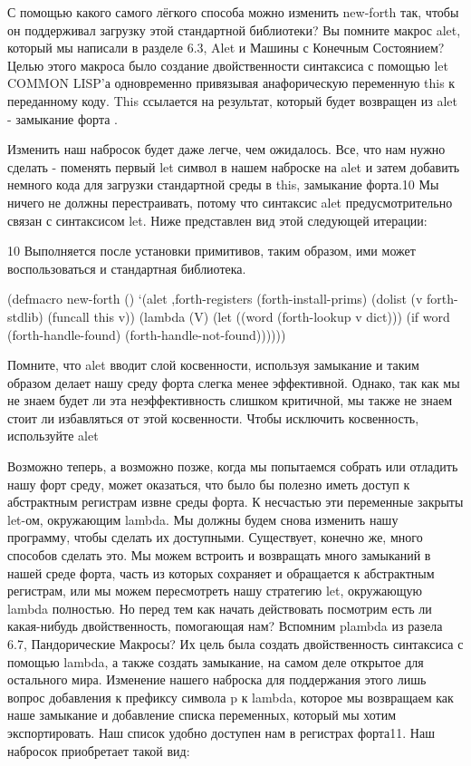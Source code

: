 С помощью какого самого лёгкого способа можно изменить new-forth так, чтобы он поддерживал загрузку этой стандартной библиотеки? Вы помните макрос alet, который мы написали в разделе 6.3, Alet и Машины с Конечным Состоянием? Целью этого макроса было создание двойственности синтаксиса с помощью let COMMON LISP'а одновременно привязывая анафорическую переменную this к переданному коду. This ссылается на результат, который будет возвращен из alet - замыкание форта .

Изменить наш набросок будет даже легче, чем ожидалось. Все, что нам нужно сделать - поменять первый let символ в нашем наброске на alet и затем добавить немного кода для загрузки стандартной среды в this, замыкание форта.10 Мы ничего не должны перестраивать, потому что синтаксис alet предусмотрительно связан с синтаксисом let. Ниже представлен вид этой следующей итерации:

10 Выполняется после установки примитивов, таким образом, ими может воспользоваться и стандартная библиотека.

(defmacro new-forth ()
‘(alet ,forth-registers
(forth-install-prims)
(dolist (v forth-stdlib)
(funcall this v))
(lambda (V)
(let ((word (forth-lookup v dict)))
(if word
(forth-handle-found)
(forth-handle-not-found))))))

Помните, что alet вводит слой косвенности, используя замыкание и таким образом делает нашу среду форта слегка менее эффективной. Однако, так как мы не знаем будет ли эта неэффективность слишком критичной, мы также не знаем стоит ли избавляться от этой косвенности. Чтобы исключить косвенность, используйте alet%

Возможно теперь, а возможно позже, когда мы попытаемся собрать или отладить нашу форт среду, может оказаться, что было бы полезно иметь доступ к абстрактным регистрам извне среды форта. К несчастью эти переменные закрыты let-ом, окружающим lambda. Мы должны будем снова изменить нашу программу, чтобы сделать их доступными. Существует, конечно же, много способов сделать это. Мы можем встроить и возвращать много замыканий в нашей среде форта, часть из которых сохраняет и обращается к абстрактным регистрам, или мы можем пересмотреть нашу стратегию let, окружающую lambda полностью. Но перед тем как начать действовать посмотрим есть ли какая-нибудь двойственность, помогающая нам? Вспомним plambda из разела 6.7, Пандорические Макросы? Их цель была создать двойственность синтаксиса с помощью lambda, а также создать замыкание, на самом деле открытое для остального мира. Изменение нашего наброска для поддержания этого лишь вопрос добавления к префиксу символа p к lambda, которое мы возвращаем как наше замыкание и добавление списка переменных, который мы хотим экспортировать. Наш список удобно доступен нам в регистрах форта11. Наш набросок приобретает такой вид:

